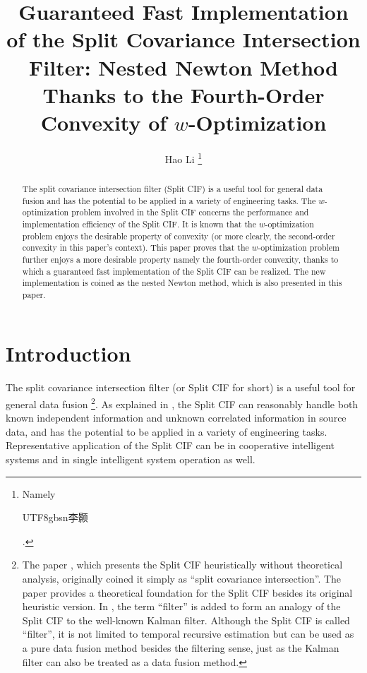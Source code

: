 \documentclass[12pt]{article}
\begin{document}
\title{Guaranteed Fast Implementation of the Split Covariance Intersection Filter: Nested Newton Method Thanks to the Fourth-Order Convexity of $w$-Optimization}
\date{}

\author{Hao Li 
\thanks{Namely \begin{CJK}{UTF8}{gbsn}李颢\end{CJK} .}
}


\maketitle

\begin{abstract}
The split covariance intersection filter (Split CIF) is a useful tool for general data fusion and has the potential to be applied in a variety of engineering tasks. The $w$-optimization problem involved in the Split CIF concerns the performance and implementation efficiency of the Split CIF. It is known that the $w$-optimization problem enjoys the desirable property of convexity (or more clearly, the second-order convexity in this paper's context). This paper proves that the $w$-optimization problem further enjoys a more desirable property namely the fourth-order convexity, thanks to which a guaranteed fast implementation of the Split CIF can be realized. The new implementation is coined as the nested Newton method, which is also presented in this paper.
\end{abstract}


\section{Introduction}

The split covariance intersection filter (or Split CIF for short) \cite{Julier2001, Li2013a, Cros2025} is a useful tool for general data fusion
\footnote{The paper \cite{Julier2001}, which presents the Split CIF heuristically without theoretical analysis, originally coined it simply as ``split covariance intersection''. The paper \cite{Li2013a} provides a theoretical foundation for the Split CIF besides its original heuristic version. In \cite{Li2013a}, the term ``filter'' is added to form an analogy of the Split CIF to the well-known Kalman filter. Although the Split CIF is called ``filter'', it is not limited to temporal recursive estimation but can be used as a pure data fusion method besides the filtering sense, just as the Kalman filter can also be treated as a data fusion method.}.
As explained in \cite{Li2013a}, the Split CIF can reasonably handle both known independent information and unknown correlated information in source data, and has the potential to be applied in a variety of engineering tasks.
Representative application of the Split CIF can be in cooperative intelligent systems \cite{Li2013b, Wanasinghe2014, Pierre2018, ChenX2020, Li2022TITS, Li2024ITS, Li2025VTT} and in single intelligent system operation \cite{Li2013d, Allig2022, Li2022RAL, Li2023AprilTagNavigation, Li2024IV} as well.
\end{document}
